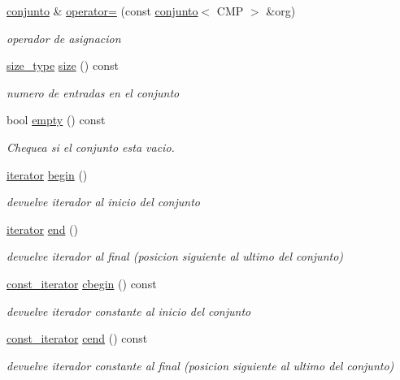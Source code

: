 \begin{DoxyCompactItemize}
\hyperlink{classconjunto}{conjunto} \& \hyperlink{classconjunto_ab3265cf7a71753510e121a8d679b74f9}{operator=} (const \hyperlink{classconjunto}{conjunto}$<$ C\-M\-P $>$ \&org)
\begin{DoxyCompactList}\small\item\em operador de asignacion \end{DoxyCompactList}\item 
\hyperlink{classconjunto_a0cc9902da62790ec2a6d59f4559c2df5}{size\-\_\-type} \hyperlink{classconjunto_aa52964752a0e77c26f720f53e64ce818}{size} () const 
\begin{DoxyCompactList}\small\item\em numero de entradas en el conjunto \end{DoxyCompactList}\item 
bool \hyperlink{classconjunto_a904716d6ae739f0461880b08138cf4e4}{empty} () const 
\begin{DoxyCompactList}\small\item\em Chequea si el conjunto esta vacio. \end{DoxyCompactList}\item 
\hyperlink{classconjunto_1_1iterator}{iterator} \hyperlink{classconjunto_a14d8b4da738e49c554c4668c4c72cb83}{begin} ()
\begin{DoxyCompactList}\small\item\em devuelve iterador al inicio del conjunto \end{DoxyCompactList}\item 
\hyperlink{classconjunto_1_1iterator}{iterator} \hyperlink{classconjunto_ab0eae433b7c2d405ac50d572c9f34d98}{end} ()
\begin{DoxyCompactList}\small\item\em devuelve iterador al final (posicion siguiente al ultimo del conjunto) \end{DoxyCompactList}\item 
\hyperlink{classconjunto_1_1const__iterator}{const\-\_\-iterator} \hyperlink{classconjunto_a9d322cecd4cb6762961f4fe1142aa816}{cbegin} () const 
\begin{DoxyCompactList}\small\item\em devuelve iterador constante al inicio del conjunto \end{DoxyCompactList}\item 
\hyperlink{classconjunto_1_1const__iterator}{const\-\_\-iterator} \hyperlink{classconjunto_a29e4161fc65cf41881193bf22b50fea5}{cend} () const 
\begin{DoxyCompactList}\small\item\em devuelve iterador constante al final (posicion siguiente al ultimo del conjunto) \end{DoxyCompactList}\item 

\end{DoxyCompactItemize}
